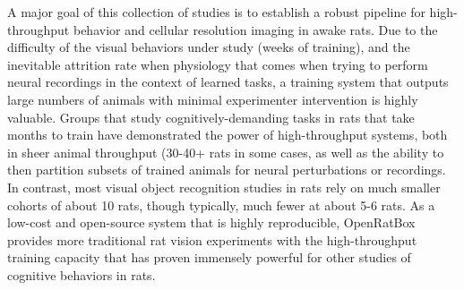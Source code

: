 A major goal of this collection of studies is to establish a robust pipeline for high-throughput behavior and cellular resolution imaging in awake rats. Due to the difficulty of the visual behaviors under study (weeks of training), and the inevitable attrition rate when physiology that comes when trying to perform neural recordings in the context of learned tasks, a training system that outputs large numbers of animals with minimal experimenter intervention is highly valuable. Groups that study cognitively-demanding tasks in rats that take months to train have demonstrated the power of high-throughput systems, both in sheer animal throughput (30-40+ rats in some cases\cite{Brunton2013, Constantinople2019}, as well as the ability to then partition subsets of trained animals for neural perturbations or recordings\cite{Erlich2011, Hanks2015, Constantinople2019}. In contrast, most visual object recognition studies in rats rely on much smaller cohorts of about 10 rats, though typically, much fewer at about 5-6 rats\cite{Zoccolan2009, Tafazoli2012, Vermaercke2012, Alemi-Neissi2013, Vinken2017}. As a low-cost and open-source system that is highly reproducible, OpenRatBox provides more traditional rat vision experiments with the high-throughput training capacity that has proven immensely powerful for other studies of cognitive behaviors in rats.





